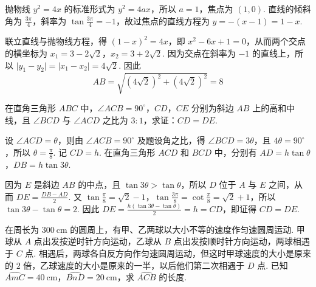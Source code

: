 \begin{solution}
抛物线 \(y^2=4x\) 的标准形式为 \(y^2=4ax\)，所以 \(a=1\)，焦点为 \(\left(1,0\right)\). 直线的倾斜角为 \(\frac{3\pi}{4}\)，斜率为 \(\tan\frac{3\pi}{4}=-1\)，故过焦点的直线方程为 \(y=-(x-1)=1-x\).

联立直线与抛物线方程，得 \((1-x)^2=4x\)，即 \(x^2-6x+1=0\)，从而两个交点的横坐标为 \(x_1=3-2\sqrt{2}\)，\(x_2=3+2\sqrt{2}\). 因为交点在斜率为 \(-1\) 的直线上，所以 \(\lvert y_1-y_2\rvert=\lvert x_1-x_2\rvert=4\sqrt{2}\). 因此
\[
AB=\sqrt{\left(4\sqrt{2}\right)^2+\left(4\sqrt{2}\right)^2}=8
\]
\end{solution}

\begin{problem}
在直角三角形 \(ABC\) 中，\( \angle ACB=90^\circ \)，\(CD\)，\(CE\) 分别为斜边 \(AB\) 上的高和中线，且 \( \angle BCD \) 与 \( \angle ACD \) 之比为 \( 3:1 \)，求证：\( CD=DE \).

\end{problem}

\begin{solution}
设 \(\angle ACD=\theta\)，则由 \(\angle ACB=90^\circ\) 及题设角之比，得 \(\angle BCD=3\theta\)，且 \(4\theta=90^\circ\)，所以 \(\theta=\frac{\pi}{8}\). 记 \(CD=h\). 在直角三角形 \(ACD\) 和 \(BCD\) 中，分别有 \(AD=h\tan\theta\)，\(DB=h\tan3\theta\).

因为 \(E\) 是斜边 \(AB\) 的中点，且 \(\tan3\theta>\tan\theta\)，所以 \(D\) 位于 \(A\) 与 \(E\) 之间，从而 \(DE=\frac{DB-AD}{2}\). 又 \(\tan\frac{\pi}{8}=\sqrt{2}-1\)，\(\tan\frac{3\pi}{8}=\cot\frac{\pi}{8}=\sqrt{2}+1\)，所以 \(\tan3\theta-\tan\theta=2\). 因此 \(DE=\frac{h\left(\tan3\theta-\tan\theta\right)}{2}=h=CD\)，即证得 \(CD=DE\).
\end{solution}

\begin{problem}
在周长为 \(300\mathrm{~cm}\) 的圆周上，有甲、乙两球以大小不等的速度作匀速圆周运动. 甲球从 \(A\) 点出发按逆时针方向运动，乙球从 \(B\) 点出发按顺时针方向运动，两球相遇于 \(C\) 点. 相遇后，两球各自反方向作匀速圆周运动，但这时甲球速度的大小是原来的 \(2\) 倍，乙球速度的大小是原来的一半，以后他们第二次相遇于 \(D\) 点. 已知 \(\widehat{AmC}=40\mathrm{~cm}\)，\(\widehat{BnD}=20\mathrm{~cm}\)，求 \(\widehat{ACB}\) 的长度.
\end{problem}

